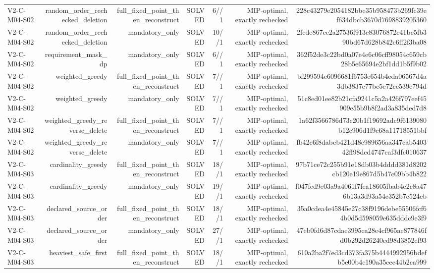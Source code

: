 {\begin{longtable}{lrrrrrr}
V2-C-M04-S02 & random\_order\_rechecked\_deletion & full\_fixed\_point\_then\_reconstruct & SOLVED & 6//1 & MIP-optimal, exactly rechecked & 228c43279e2054182bbe35b958473b269fc39ef634dbcb3670d7698839205360 \\
V2-C-M04-S02 & random\_order\_rechecked\_deletion & mandatory\_only & SOLVED & 10//1 & MIP-optimal, exactly rechecked & 2fcde867ec2a27536f913c83076872c41be5fb390bd67d628b842c6ff2f3ba08 \\
V2-C-M04-S02 & requirement\_mask\_dp & mandatory\_only & SOLVED & 6//1 & MIP-optimal, exactly rechecked & 362f52de3c22bd0a07e4e6c06cff98054c659cb28b5e65694e2bf1dd1b5f9b02 \\
V2-C-M04-S02 & weighted\_greedy & full\_fixed\_point\_then\_reconstruct & SOLVED & 7//1 & MIP-optimal, exactly rechecked & bf299594e6096681f6753e654b4eda06567d4a3db3837c77bc5e72cc539e794d \\
V2-C-M04-S02 & weighted\_greedy & mandatory\_only & SOLVED & 7//1 & MIP-optimal, exactly rechecked & 51c8ed01ee82b21cfa9241c5a2a426f797eef45909e55b9b8f2ad3a835ded7d8 \\
V2-C-M04-S02 & weighted\_greedy\_reverse\_delete & full\_fixed\_point\_then\_reconstruct & SOLVED & 7//1 & MIP-optimal, exactly rechecked & 1a62f3566786d73c20b1f19692adc9f6139080b12c906d1f9c68a11718551bbf \\
V2-C-M04-S02 & weighted\_greedy\_reverse\_delete & mandatory\_only & SOLVED & 7//1 & MIP-optimal, exactly rechecked & fb42c6f8dabcb421d48e989656aa347cab540342ff98dcd4747caf3dfc010637 \\
V2-C-M04-S03 & cardinality\_greedy & full\_fixed\_point\_then\_reconstruct & SOLVED & 18//1 & MIP-optimal, exactly rechecked & 97b71ce72c255b91e18db03b4dddd381d8202cb120e19e867d5b47c09bb4b822 \\
V2-C-M04-S03 & cardinality\_greedy & mandatory\_only & SOLVED & 19//1 & MIP-optimal, exactly rechecked & f047fed9e03a9a4061f7fea18605fbab4e2c8a476b13a3d93a54c352b7e524eb \\
V2-C-M04-S03 & declared\_source\_order & full\_fixed\_point\_then\_reconstruct & SOLVED & 18//1 & MIP-optimal, exactly rechecked & 35a0cdea4e45845e27c38f9196debe55506fcf64b0d5d598059e635dddc9e3f9 \\
V2-C-M04-S03 & declared\_source\_order & mandatory\_only & SOLVED & 27//1 & MIP-optimal, exactly rechecked & 47eb0fd6d87cdae3995ea28e4cf965ae877846fd0b292d26240ed98d3852ef93 \\
V2-C-M04-S03 & heaviest\_safe\_first & full\_fixed\_point\_then\_reconstruct & SOLVED & 18//1 & MIP-optimal, exactly rechecked & 610a2ba2f7ed3cd373fa375b4444992956bdefb5e00b4c190a35cec44b2ca999 \\

\end{longtable}}
